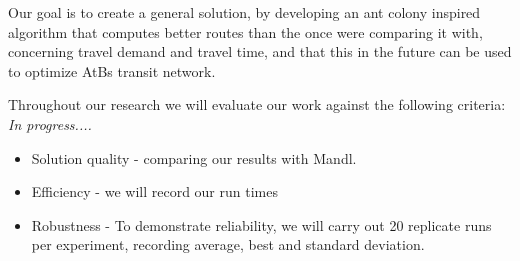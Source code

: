Our goal is to create a general solution, by developing an ant colony inspired algorithm that computes better routes than the once were comparing it with, concerning travel demand and travel time, and that this in the future can be used to optimize AtBs transit network. %

Throughout our research we will evaluate our work against the following criteria: \textit{In progress....}
\begin{itemize}
\item Solution quality - comparing our results with Mandl.
\item Efficiency - we will record our run times
\item Robustness - To demonstrate reliability, we will carry out 20 replicate runs per experiment, recording average, best and standard deviation. 
\end{itemize}




